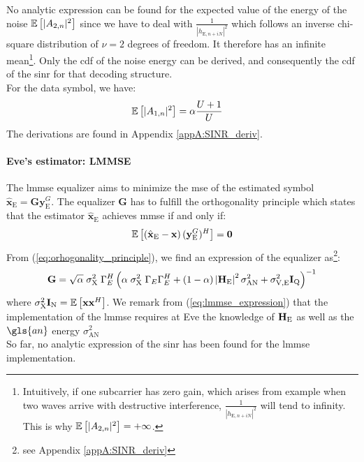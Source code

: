 No analytic expression can be found for the expected value of the energy of the noise $\mathbb{E} \left[|A_{2,n}|^2\right]$ since we have to deal with $\frac{1}{|h_{\text{E}, n + iN}|^2}$ which follows an inverse chi-square distribution of $\nu=2$ degrees of freedom. It therefore has an infinite mean\footnote{Intuitively, if one subcarrier has zero gain, which arises from example when two waves arrive with destructive interference, $\frac{1}{|h_{\text{E}, n + iN}|^2}$ will tend to infinity. This is why $\mathbb{E} \left[|A_{2,n}|^2\right] = +\infty$.}. Only the \gls{cdf} of the noise energy can be derived, and consequently the \gls{cdf} of the \gls{sinr} for that decoding structure. \\
For the data symbol, we have:
\begin{equation}
    \begin{split}
        &\mathbb{E} \left[|A_{1,n}|^2\right] = \alpha \frac{U+1}{U}
    \end{split}
    \label{eq:expected_eve_filt2}
\end{equation}
The derivations are found in Appendix \ref{appA:SINR_deriv}.

\paragraph{Eve's estimator: LMMSE}
The \gls{lmmse} equalizer aims to minimize the \gls{mse} of the estimated symbol $\hat{\textbf{x}}_\text{E} = \textbf{G} \textbf{y}_{\text{E}}^G$. The equalizer $\textbf{G}$ has to fulfill the orthogonality principle which states that the estimator $\hat{\textbf{x}}_\text{E}$ achieves \gls{mmse} if and only if:
\begin{equation}
    \mathbb{E} \left[\left( \hat{\textbf{x}}_\text{E} - \textbf{x}\right)(\textbf{y}_{\text{E}}^G)^H\right] = \textbf{0}
    \label{eq:orhogonality_principle}
\end{equation}
From (\ref{eq:orhogonality_principle}), we find an expression of the equalizer as\footnote{see Appendix \ref{appA:SINR_deriv}}:
\begin{equation}
    \textbf{G} = \sqrt{\alpha}\; \sigma_{\text{X}}^2\; \Gamma_E^H \left( \alpha \;\sigma_\text{X}^2 \; \Gamma_E \Gamma_E^H + (1-\alpha) \left|\textbf{H}_{\text{E}}\right|^2 \sigma^2_{\text{AN}} + \sigma^2_{\text{V,E}} \textbf{I}_{\text{Q}} \right)^{-1}
    \label{eq:lmmse_expression}
\end{equation}
where $\sigma_\text{X}^2 \textbf{I}_{\text{N}} = \mathbb{E} \left[\textbf{xx}^H\right]$. We remark from (\ref{eq:lmmse_expression}) that the implementation of the \gls{lmmse} requires at Eve the knowledge of $\textbf{H}_{\text{E}}$ as well as the $\gls{an}$ energy $\sigma^2_{\text{AN}}$\\
So far, no analytic expression of the \gls{sinr} has been found for the \gls{lmmse} implementation.


